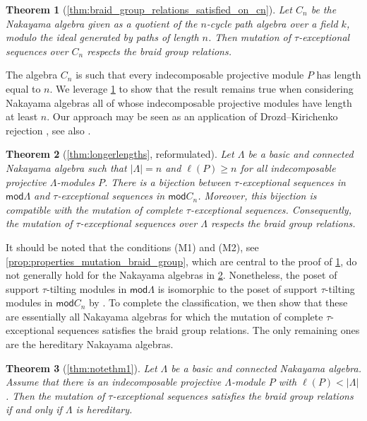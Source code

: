 \documentclass[11pt]{amsart}
\newcommand{\mods}{\mathsf{mod}}
\newtheorem{theorem}{Theorem}[section]
\theoremstyle{definition}
\begin{document}
\begin{theorem}[\cref{thm:braid_group_relations_satisfied_on_cn}]\label{thm:introthm1}
    Let $C_n$ be the Nakayama algebra given as a quotient of the $n$-cycle path algebra over a field $k$, modulo the ideal generated by paths of length $n$. Then mutation of $\tau$-exceptional sequences over $C_n$ respects the braid group relations.
\end{theorem}

The algebra $C_n$ is such that every indecomposable projective module $P$ has length equal to $n$. We leverage \cref{thm:introthm1} to show that the result remains true when considering Nakayama algebras all of whose indecomposable projective modules have length at least $n$. Our approach may be seen as an application of Drozd--Kirichenko rejection \cite{DrozdKirichenko}, see also \cite[Sec. 3]{Adachi2016}.


\begin{theorem}[\cref{thm:longerlengths}, reformulated]\label{thm:introthm2}
    Let $\Lambda$ be a basic and connected Nakayama algebra such that $|\Lambda|=n$ and $\ell(P) \geq n$ for all indecomposable projective $\Lambda$-modules $P$. There is a bijection between $\tau$-exceptional sequences in $\mods \Lambda$ and $\tau$-exceptional sequences in $\mods C_n$. Moreover, this bijection is compatible with the mutation of complete $\tau$-exceptional sequences. Consequently, the mutation of $\tau$-exceptional sequences over $\Lambda$ respects the braid group relations.
\end{theorem}

It should be noted that the conditions (M1) and (M2), see \cref{prop:properties_mutation_braid_group}, which are central to the proof of \cref{thm:introthm1}, do not generally hold for the Nakayama algebras in \cref{thm:introthm2}. Nonetheless, the poset of support $\tau$-tilting modules in $\mods \Lambda$ is isomorphic to the poset of support $\tau$-tilting modules in $\mods C_n$ by \cite[Thm. 3.11]{Adachi2016}. To complete the classification, we then show that these are essentially all Nakayama algebras for which the mutation of complete $\tau$-exceptional sequences satisfies the braid group relations. The only remaining ones are the hereditary Nakayama algebras. 

\begin{theorem}[\cref{thm:notethm1}]\label{thm:introthm3}
    Let $\Lambda$ be a basic and connected Nakayama algebra. Assume that there is an indecomposable projective $\Lambda$-module $P$ with $\ell(P) < |\Lambda|$. Then the mutation of $\tau$-exceptional sequences satisfies the braid group relations if and only if $\Lambda$ is hereditary. 
\end{theorem}
\end{document}
